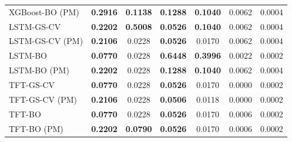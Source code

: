 \begin{table}[!h]
\begin{tabular*}{\tblwidth}{@{} L C C C C C C @{}}
XGBoost-BO (PM) & \textbf{0.2916} & \textbf{0.1138} & \textbf{0.1288} & \textbf{0.1040} & 0.0062 & 0.0004 \\
LSTM-GS-CV & \textbf{0.2202} & \textbf{0.5008} & \textbf{0.0526} & \textbf{0.1040} & 0.0062 & 0.0004 \\
LSTM-GS-CV (PM) & \textbf{0.2106} & 0.0228 & \textbf{0.0526} & 0.0170 & 0.0062 & 0.0004 \\
LSTM-BO & \textbf{0.0770} & 0.0228 & \textbf{0.6448} & \textbf{0.3996} & 0.0022 & 0.0002 \\
LSTM-BO (PM) & \textbf{0.2202} & 0.0228 & \textbf{0.1288} & \textbf{0.1040} & 0.0062 & 0.0004 \\
TFT-GS-CV & \textbf{0.0770} & 0.0228 & \textbf{0.0526} & 0.0170 & 0.0000 & 0.0002 \\
TFT-GS-CV (PM) & \textbf{0.2106} & 0.0228 & \textbf{0.0506} & 0.0118 & 0.0000 & 0.0002 \\
TFT-BO & \textbf{0.0770} & 0.0228 & \textbf{0.0526} & 0.0170 & 0.0006 & 0.0002 \\
TFT-BO (PM) & \textbf{0.2202} & \textbf{0.0790} & \textbf{0.0526} & 0.0170 & 0.0006 & 0.0002 \\
\bottomrule
\end{tabular*}
\end{table}

